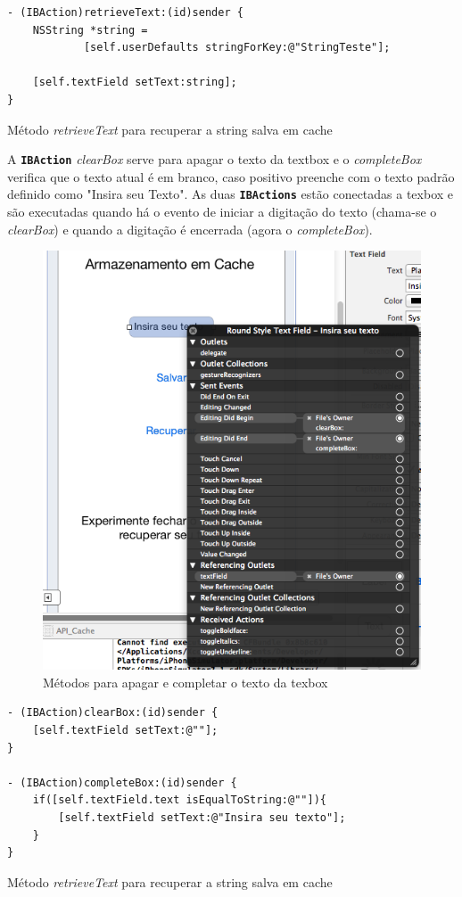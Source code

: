 \documentclass[a4paper,12pt,brazil,oneside]{book}
\begin{document}
\begin{listing}[H]
\begin{verbatim}
- (IBAction)retrieveText:(id)sender {
    NSString *string = 
    		[self.userDefaults stringForKey:@"StringTeste"];
    
    [self.textField setText:string];
}
\end{verbatim}
\caption{Método \emph{retrieveText} para recuperar a string salva em cache}
\end{listing}


A  \texttt{\textbf{IBAction}} \emph{clearBox} serve para apagar o texto da textbox e o \emph{completeBox} verifica que o texto atual é em branco, caso positivo preenche com o texto padrão definido como "Insira seu Texto".
As duas \texttt{\textbf{IBActions}} estão conectadas a texbox e são executadas quando há o evento de iniciar a digitação do texto (chama-se o \emph{clearBox}) e quando a digitação é encerrada (agora o \emph{completeBox}).

\begin{figure}[H]
  \centering
  \includegraphics[width=.75\textwidth]{figuras/4/app_cache_ibaction.png}
  \caption{Métodos para apagar e completar o texto da texbox}
  \label{fig:app_cache_ibaction}
\end{figure}

\begin{listing}[H]
\begin{verbatim}
- (IBAction)clearBox:(id)sender {
    [self.textField setText:@""];
}

- (IBAction)completeBox:(id)sender {
    if([self.textField.text isEqualToString:@""]){
        [self.textField setText:@"Insira seu texto"];
    }
}
\end{verbatim}
\caption{Método \emph{retrieveText} para recuperar a string salva em cache}
\end{listing}
\end{document}
